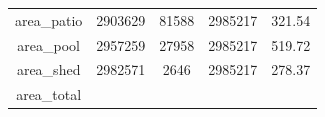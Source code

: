\documentclass[]{book}
\theoremstyle{definition}
\theoremstyle{definition}
\theoremstyle{definition}
\theoremstyle{remark}
\begin{document}
\begin{longtable}[]{@{}ccccc@{}}
\begin{minipage}[t]{0.35\columnwidth}
area\_patio\strut
\end{minipage} & \begin{minipage}[t]{0.12\columnwidth}\centering\strut
2903629\strut
\end{minipage} & \begin{minipage}[t]{0.13\columnwidth}\centering\strut
81588\strut
\end{minipage} & \begin{minipage}[t]{0.12\columnwidth}\centering\strut
2985217\strut
\end{minipage} & \begin{minipage}[t]{0.12\columnwidth}\centering\strut
321.54\strut
\end{minipage}\tabularnewline
\begin{minipage}[t]{0.35\columnwidth}\centering\strut
area\_pool\strut
\end{minipage} & \begin{minipage}[t]{0.12\columnwidth}\centering\strut
2957259\strut
\end{minipage} & \begin{minipage}[t]{0.13\columnwidth}\centering\strut
27958\strut
\end{minipage} & \begin{minipage}[t]{0.12\columnwidth}\centering\strut
2985217\strut
\end{minipage} & \begin{minipage}[t]{0.12\columnwidth}\centering\strut
519.72\strut
\end{minipage}\tabularnewline
\begin{minipage}[t]{0.35\columnwidth}\centering\strut
area\_shed\strut
\end{minipage} & \begin{minipage}[t]{0.12\columnwidth}\centering\strut
2982571\strut
\end{minipage} & \begin{minipage}[t]{0.13\columnwidth}\centering\strut
2646\strut
\end{minipage} & \begin{minipage}[t]{0.12\columnwidth}\centering\strut
2985217\strut
\end{minipage} & \begin{minipage}[t]{0.12\columnwidth}\centering\strut
278.37\strut
\end{minipage}\tabularnewline
\begin{minipage}[t]{0.35\columnwidth}\centering\strut
area\_total\strut
\end{minipage} & \begin{minipage}[t]{0.12\columnwidth}\centering\strut

\end{minipage}
\end{longtable}
\end{document}
